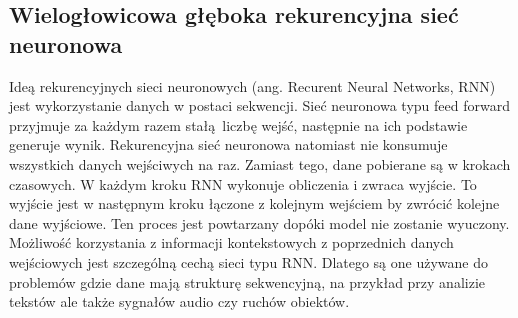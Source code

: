\subsection{Wielogłowicowa głęboka rekurencyjna sieć neuronowa}
Ideą rekurencyjnych sieci neuronowych (ang. Recurent Neural Networks, RNN) jest wykorzystanie danych w postaci sekwencji. 
Sieć neuronowa typu feed forward przyjmuje za każdym razem stałą liczbę wejść, następnie na ich podstawie generuje wynik. 
Rekurencyjna sieć neuronowa natomiast nie konsumuje wszystkich danych wejściwych na raz. Zamiast tego,
dane pobierane są w krokach czasowych. W każdym kroku RNN wykonuje obliczenia i zwraca wyjście. 
To wyjście jest w następnym kroku łączone z kolejnym wejściem by zwrócić kolejne dane wyjściowe. 
Ten proces jest powtarzany dopóki model nie zostanie wyuczony. Możliwość korzystania z 
informacji kontekstowych z poprzednich danych wejściowych jest szczególną cechą sieci typu RNN. Dlatego
są one używane do problemów gdzie dane mają strukturę sekwencyjną, na przykład
przy analizie tekstów ale także sygnałów audio czy ruchów obiektów.


